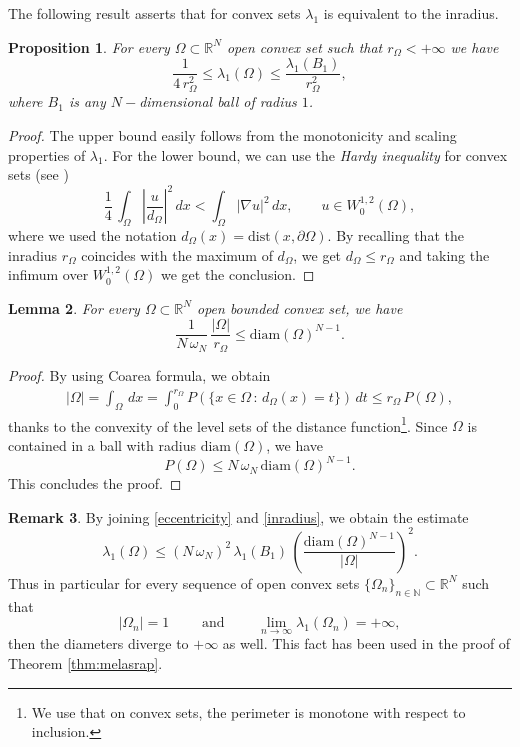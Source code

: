 \documentclass{amsart}
\newtheorem{lemma}{Lemma}[section]
\newtheorem{proposition}[lemma]{Proposition}
\theoremstyle{definition}
\newtheorem{remark}[lemma]{Remark}
\numberwithin{equation}{section}
\begin{document}
The following result asserts that for convex sets $\lambda_1$ is equivalent to the inradius.
\begin{proposition}
For every $\Omega\subset\mathbb{R}^N$ open convex set such that $r_\Omega<+\infty$ we have
\begin{equation}
\label{inradius}
\frac{1}{4\,r_\Omega^2}\le\lambda_1(\Omega)\le \frac{\lambda_1(B_1)}{r_\Omega^2},
\end{equation}
where $B_1$ is any $N-$dimensional ball of radius $1$.
\end{proposition}
\begin{proof}
The upper bound easily follows from the monotonicity and scaling properties of $\lambda_1$. For the lower bound, we can use the {\it Hardy inequality} for convex sets (see \cite{MR174788})
\[
\frac{1}{4}\,\int_{\Omega} \left|\frac{u}{d_\Omega}\right|^2\,dx<\int_\Omega |\nabla u|^2\,dx,\qquad u\in W^{1,2}_0(\Omega),
\]
where we used the notation $d_\Omega(x)=\mathrm{dist}(x,\partial\Omega)$. By recalling that the inradius $r_\Omega$ coincides with the maximum of $d_\Omega$, we get $d_\Omega\le r_\Omega$ and taking the infimum over $W^{1,2}_0(\Omega)$ we get the conclusion.
\end{proof}

\begin{lemma}
For every $\Omega\subset\mathbb{R}^N$ open bounded convex set, we have
\begin{equation}
\label{eccentricity}
\frac{1}{N\,\omega_N}\,\frac{|\Omega|}{r_\Omega}\le\mathrm{diam}(\Omega)^{N-1}.
\end{equation}
\end{lemma}
\begin{proof}
By using Coarea formula, we obtain
\[
\begin{split}
|\Omega|=\int_\Omega\,dx=\int_{0}^{r_\Omega} P(\{x\in\Omega\, :\, d_\Omega(x)=t\})\,dt\le r_\Omega\,P(\Omega),
\end{split}
\]
thanks to the convexity of the level sets of the distance function\footnote{We use that on convex sets, the perimeter is monotone with respect to inclusion.}. Since $\Omega$ is contained in a ball with radius $\mathrm{diam}(\Omega)$, we have
\[
P(\Omega)\le N\,\omega_N\,\mathrm{diam}(\Omega)^{N-1}.
\]
This concludes the proof.
\end{proof}
\begin{remark}
\label{rem:ABC}
By joining \eqref{eccentricity} and \eqref{inradius}, we obtain the estimate
\[
\lambda_1(\Omega)\le (N\,\omega_N)^2\,\lambda_1(B_1)\,\left(\frac{\mathrm{diam}(\Omega)^{N-1}}{|\Omega|}\right)^2.
\]
Thus in particular for every sequence of open convex sets $\{\Omega_n\}_{n\in\mathbb{N}}\subset\mathbb{R}^N$ such that
\[
|\Omega_n|=1\qquad \mbox{ and }\qquad \lim_{n\to\infty} \lambda_1(\Omega_n)=+\infty,
\]
then the diameters diverge to $+\infty$ as well. This fact has been used in the proof of Theorem \ref{thm:melasrap}.
\end{remark}
\end{document}
